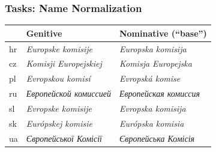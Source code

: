 \documentclass{beamer}
\newcommand\textcyr[1]{{\fontencoding{T2A}\selectfont #1}}
\newcommand{\comment}[1]{}
\begin{document}
\begin{frame}[fragile]
 \frametitle{Tasks: Name Normalization}

\begin{table}
  \begin{center}
    \begin{footnotesize}      
      \begin{tabular}{lll}
        \toprule 
        \comment{Lan} & {Genitive} & {Nominative (``base'')}\\
        \midrule
        hr & {\color{blue}\textit{Europske komisije}} & {\color{blue}\textit{Europska komisija}} \\
        cz & {\color{blue}\textit{Komisji Europejskiej}} & {\color{blue}\textit{Komisja Europejska}} \\
        pl & {\color{blue}\textit{Evropskou komisí}} & {\color{blue}\textit{Evropská komise}} \\
       ru & {\color{blue}\textit{\textcyr{Европейской комиссией}}} & {\color{blue}\textit{\textcyr{Европейская комиссия}}} \\
        sl & {\color{blue}\textit{Evropske komisije}} & {\color{blue}\textit{Evropska komisija}} \\
        sk & {\color{blue}\textit{Európskej komisie}} & {\color{blue}\textit{Európska komisia}} \\
        ua & {\color{blue}\textit{\textcyr{Європейської Комісії}}} & {\color{blue}\textit{\textcyr{Європейська Комісія}}} \\
        \bottomrule
      \end{tabular}
    \end{footnotesize}
  \end{center}
\end{table}

\end{frame}
\end{document}
